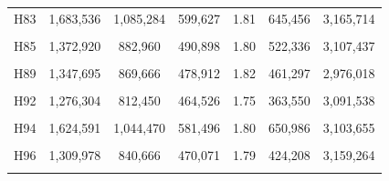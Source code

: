 \documentclass[
  a4paper,
  titlepage]{article}
\begin{document}
\begin{longtable}[t]{ccccccc}
H83 & 1,683,536 & 1,085,284 & 599,627 & 1.81 & 645,456 & 3,165,714\\
 
\cellcolor{gray!6}{H84} & \cellcolor{gray!6}{1,147,137} & \cellcolor{gray!6}{731,188} & \cellcolor{gray!6}{416,555} & \cellcolor{gray!6}{1.76} & \cellcolor{gray!6}{338,709} & \cellcolor{gray!6}{3,005,174}\\
 
H85 & 1,372,920 & 882,960 & 490,898 & 1.80 & 522,336 & 3,107,437\\
 
\cellcolor{gray!6}{H87} & \cellcolor{gray!6}{1,383,683} & \cellcolor{gray!6}{890,912} & \cellcolor{gray!6}{493,702} & \cellcolor{gray!6}{1.80} & \cellcolor{gray!6}{471,973} & \cellcolor{gray!6}{3,050,734}\\
 
H89 & 1,347,695 & 869,666 & 478,912 & 1.82 & 461,297 & 2,976,018\\
 
\cellcolor{gray!6}{H91} & \cellcolor{gray!6}{1,076,363} & \cellcolor{gray!6}{693,139} & \cellcolor{gray!6}{383,778} & \cellcolor{gray!6}{1.81} & \cellcolor{gray!6}{400,360} & \cellcolor{gray!6}{2,837,751}\\
 
H92 & 1,276,304 & 812,450 & 464,526 & 1.75 & 363,550 & 3,091,538\\
 
\cellcolor{gray!6}{H93} & \cellcolor{gray!6}{1,093,113} & \cellcolor{gray!6}{701,281} & \cellcolor{gray!6}{392,460} & \cellcolor{gray!6}{1.79} & \cellcolor{gray!6}{363,892} & \cellcolor{gray!6}{3,005,324}\\
 
H94 & 1,624,591 & 1,044,470 & 581,496 & 1.80 & 650,986 & 3,103,655\\
 
\cellcolor{gray!6}{H95} & \cellcolor{gray!6}{1,252,707} & \cellcolor{gray!6}{806,171} & \cellcolor{gray!6}{447,240} & \cellcolor{gray!6}{1.80} & \cellcolor{gray!6}{428,421} & \cellcolor{gray!6}{3,083,227}\\
 
H96 & 1,309,978 & 840,666 & 470,071 & 1.79 & 424,208 & 3,159,264\\
 
\cellcolor{gray!6}{H97} & \cellcolor{gray!6}{1,114,153} & \cellcolor{gray!6}{712,392} & \cellcolor{gray!6}{402,276} & \cellcolor{gray!6}{1.77} & \cellcolor{gray!6}{312,429} & \cellcolor{gray!6}{2,910,565}\\
 

\end{longtable}
\end{document}
